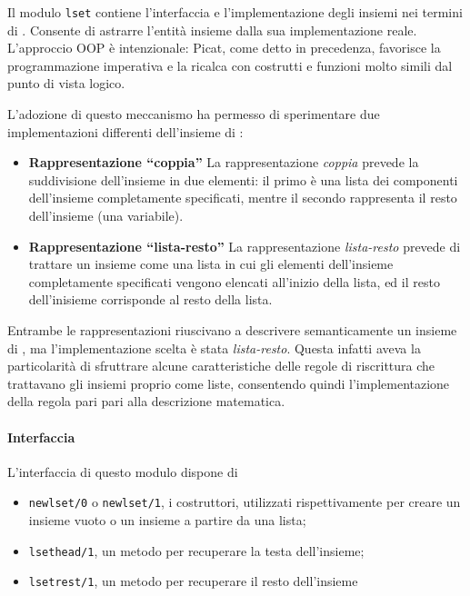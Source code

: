 \documentclass[12pt,a4paper,openright]{book} %
\begin{document}
Il modulo \texttt{lset} contiene l'interfaccia e l'implementazione
degli insiemi nei termini di \lset{}. Consente di astrarre l'entità
insieme dalla sua implementazione reale. L'approccio OOP è
intenzionale: Picat, come detto in precedenza, favorisce la
programmazione imperativa e la ricalca con costrutti e funzioni molto
simili dal punto di vista logico.

L'adozione di questo meccanismo ha permesso di sperimentare due
implementazioni differenti dell'insieme di \lset{}:

\begin{itemize}
	\item \textbf{Rappresentazione ``coppia''} La rappresentazione
          \emph{coppia} prevede la suddivisione dell'insieme in due
          elementi: il primo è una lista dei componenti dell'insieme
          completamente specificati, mentre il secondo rappresenta il
          resto dell'insieme (una variabile).
	\item \textbf{Rappresentazione ``lista-resto''} La
          rappresentazione \emph{lista-resto} prevede di trattare un
          insieme come una lista in cui gli elementi dell'insieme
          completamente specificati vengono elencati all'inizio della
          lista, ed il resto dell'inisieme corrisponde al resto della
          lista.
\end{itemize}

Entrambe le rappresentazioni riuscivano a descrivere semanticamente un
insieme di \lset{}, ma l'implementazione scelta è stata
\emph{lista-resto}. Questa infatti aveva la particolarità di
sfruttrare alcune caratteristiche delle regole di riscrittura che
trattavano gli insiemi proprio come liste, consentendo quindi
l'implementazione della regola pari pari alla descrizione matematica.

\paragraph{Interfaccia}

L'interfaccia di questo modulo dispone di
\begin{itemize}
	\item \texttt{new\textunderscore lset/0} o
          \texttt{new\textunderscore lset/1}, i costruttori,
          utilizzati rispettivamente per creare un insieme vuoto o un
          insieme a partire da una lista;
	\item \texttt{lset\textunderscore head/1}, un metodo per
          recuperare la testa dell'insieme;
	\item \texttt{lset\textunderscore rest/1}, un metodo per
          recuperare il resto dell'insieme
\end{itemize}
\end{document}
